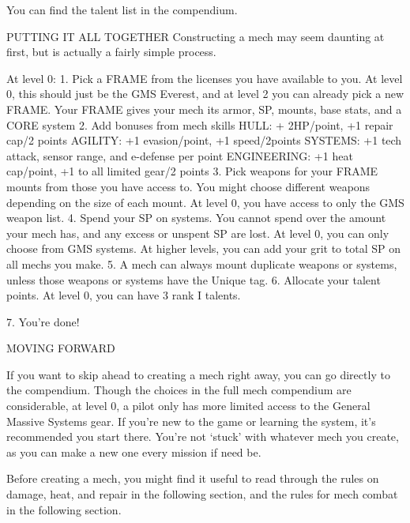 You can find the talent list in the compendium.


                                   PUTTING IT ALL TOGETHER
Constructing a mech may seem daunting at first, but is actually a fairly simple process.

At level 0:
     1.  Pick a FRAME from the licenses you have available to you. At level 0, this should just be
         the GMS Everest, and at level 2 you can already pick a new FRAME. Your FRAME gives
         your mech its armor, SP, mounts, base stats, and a CORE system
    2.   Add bonuses from mech skills
                 HULL: + 2HP/point, +1 repair cap/2 points
                 AGILITY: +1 evasion/point, +1 speed/2points
                 SYSTEMS: +1 tech attack, sensor range, and e-defense per point
                 ENGINEERING: +1 heat cap/point, +1 to all limited gear/2 points
    3.   Pick weapons for your FRAME mounts from those you have access to. You might choose
         different weapons depending on the size of each mount. At level 0, you have access to
         only the GMS weapon list.
    4.   Spend your SP on systems. You cannot spend over the amount your mech has, and any
         excess or unspent SP are lost. At level 0, you can only choose from GMS systems. At
         higher levels, you can add your grit to total SP on all mechs you make.
    5.   A mech can always mount duplicate weapons or systems, unless those weapons or
         systems have the Unique tag.
    6.   Allocate your talent points. At level 0, you can have 3 rank I talents.

    7.   You’re done!





                                             MOVING FORWARD

If you want to skip ahead to creating a mech right away, you can go directly to the compendium.
Though the choices in the full mech compendium are considerable, at level 0, a pilot only has
more limited access to the General Massive Systems gear. If you’re new to the game or learning
the system, it’s recommended you start there. You’re not ‘stuck’ with whatever mech you create,
as you can make a new one every mission if need be.

Before creating a mech, you might find it useful to read through the rules on damage, heat, and
repair in the following section, and the rules for mech combat in the following section.

